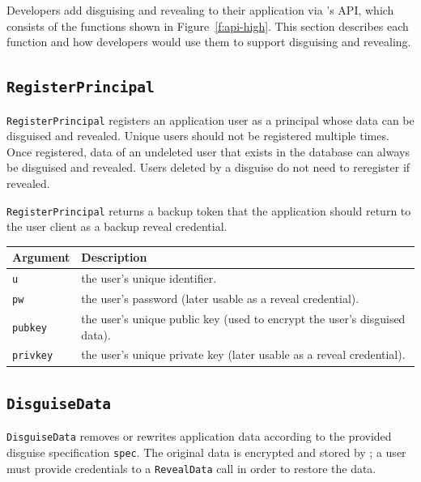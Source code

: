 Developers add disguising and revealing to their application via \sys's API,
which consists of the functions shown in Figure~\ref{f:api-high}. This section
describes each function and how developers would use them to support disguising
and revealing.

\subsection{\texttt{RegisterPrincipal}}
    \texttt{RegisterPrincipal} registers an application user as a principal whose data can be disguised and
    revealed. Unique users should not be registered multiple times. Once
    registered, data of an undeleted user that exists in the database can always
    be disguised and revealed.  Users deleted by a disguise do not need to
    reregister if revealed.

    \texttt{RegisterPrincipal} returns a backup token that the application should return to
    the user client as a backup reveal credential.

    \begin{center}
    \begin{longtable}{|m{}|m{}|}
        \hline
        \textbf{Argument} & \textbf{Description} \\
        \hline
        \texttt{u} & the user's unique identifier.\\
        \hline
        \texttt{pw} & the user's password (later usable as a reveal credential).\\
        \hline
        \texttt{pubkey} & the user's unique public key (used to encrypt the
        user's disguised data).\\
        \hline
        \texttt{privkey} & the user's unique private key (later usable as a reveal
        credential).\\
        \hline
    \end{longtable}
    \end{center}

\subsection{\texttt{DisguiseData}}
    \texttt{DisguiseData} removes or rewrites application data according to
    the provided disguise specification \texttt{spec}. The original data
    is encrypted and stored by \sys; a user must provide
    credentials to a \texttt{RevealData} call in order to restore the data.

